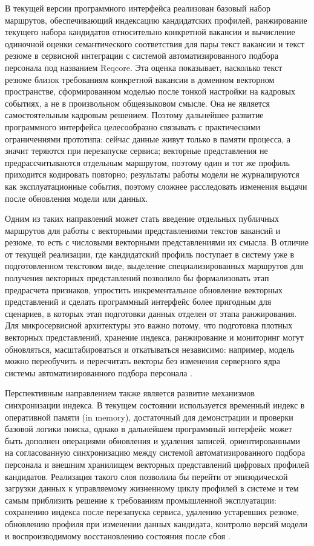 В текущей версии программного интерфейса реализован базовый набор маршрутов, обеспечивающий индексацию кандидатских профилей, ранжирование текущего набора кандидатов относительно конкретной вакансии и вычисление одиночной оценки семантического соответствия для пары текст вакансии и текст резюме в сервисной интеграции с системой автоматизированного подбора персонала под названием Reqcore. Эта оценка показывает, насколько текст резюме близок требованиям конкретной вакансии в доменном векторном пространстве, сформированном моделью после тонкой настройки на кадровых событиях, а не в произвольном общеязыковом смысле. Она не является самостоятельным кадровым решением. Поэтому дальнейшее развитие программного интерфейса целесообразно связывать с практическими ограничениями прототипа: сейчас данные живут только в памяти процесса, а значит теряются при перезапуске сервиса; векторные представления не предрассчитываются отдельным маршрутом, поэтому один и тот же профиль приходится кодировать повторно; результаты работы модели не журналируются как эксплуатационные события, поэтому сложнее расследовать изменения выдачи после обновления модели или данных.\par
Одним из таких направлений может стать введение отдельных публичных маршрутов для работы с векторными представлениями текстов вакансий и резюме, то есть с числовыми векторными представлениями их смысла. В отличие от текущей реализации, где кандидатский профиль поступает в систему уже в подготовленном текстовом виде, выделение специализированных маршрутов для получения векторных представлений позволило бы формализовать этап предрасчета признаков, упростить инкрементальное обновление векторных представлений и сделать программный интерфейс более пригодным для сценариев, в которых этап подготовки данных отделен от этапа ранжирования. Для микросервисной архитектуры это важно потому, что подготовка плотных векторных представлений, хранение индекса, ранжирование и мониторинг могут обновляться, масштабироваться и откатываться независимо: например, модель можно переобучить и пересчитать векторы без изменения серверного ядра системы автоматизированного подбора персонала \cite{src32, src33}.\par
Перспективным направлением также является развитие механизмов синхронизации индекса. В текущем состоянии используется временный индекс в оперативной памяти (in memory), достаточный для демонстрации и проверки базовой логики поиска, однако в дальнейшем программный интерфейс может быть дополнен операциями обновления и удаления записей, ориентированными на согласованную синхронизацию между системой автоматизированного подбора персонала и внешним хранилищем векторных представлений цифровых профилей кандидатов. Реализация такого слоя позволила бы перейти от эпизодической загрузки данных к управляемому жизненному циклу профилей в системе и тем самым приблизить решение к требованиям промышленной эксплуатации: сохранению индекса после перезапуска сервиса, удалению устаревших резюме, обновлению профиля при изменении данных кандидата, контролю версий модели и воспроизводимому восстановлению состояния после сбоя \cite{src12, src32, src33}.\par
